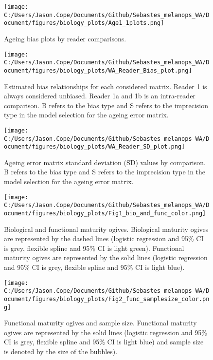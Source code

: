 \documentclass[11pt,
  letterpaper,
]{article}
\begin{document}
\clearpage

\begin{figure}
{\centering
\texttt{[image: C:/Users/Jason.Cope/Documents/Github/Sebastes\_melanops\_WA/Document/figures/biology\_plots/Age1\_1plots.png]}
}
\caption{Ageing bias plots by reader comparisons.\label{fig:a1-bias}}
\end{figure}

\pagebreak

\begin{figure}
{\centering
\texttt{[image: C:/Users/Jason.Cope/Documents/Github/Sebastes\_melanops\_WA/Document/figures/biology\_plots/WA\_Reader\_Bias\_plot.png]}
}
\caption{Estimated bias relationships for each considered matrix. Reader 1 is always considered unbiased. Reader 1a and 1b is an intra-reader comparison. B refers to the bias type and S refers to the imprecision type in the model selection for the ageing error matrix.\label{fig:age-error-bias}}
\end{figure}

\pagebreak

\begin{figure}
{\centering
\texttt{[image: C:/Users/Jason.Cope/Documents/Github/Sebastes\_melanops\_WA/Document/figures/biology\_plots/WA\_Reader\_SD\_plot.png]}
}
\caption{Ageing error matrix standard deviation (SD) values by comparison. B refers to the bias type and S refers to the imprecision type in the model selection for the ageing error matrix.\label{fig:age-error-sd}}
\end{figure}

\pagebreak

\begin{figure}
{\centering
\texttt{[image: C:/Users/Jason.Cope/Documents/Github/Sebastes\_melanops\_WA/Document/figures/biology\_plots/Fig1\_bio\_and\_func\_color.png]}
}
\caption{Biological and functional maturity ogives. Biological maturity ogives are represented by the dashed lines (logistic regression and 95\% CI is grey, flexible spline and 95\% CI is light green). Functional maturity ogives are represented by the solid lines (logistic regression and 95\% CI is grey, flexible spline and 95\% CI is light blue).\label{fig:bio-fxn-mat-color}}
\end{figure}

\pagebreak

\begin{figure}
{\centering
\texttt{[image: C:/Users/Jason.Cope/Documents/Github/Sebastes\_melanops\_WA/Document/figures/biology\_plots/Fig2\_func\_samplesize\_color.png]}
}
\caption{Functional maturity ogives and sample size. Functional maturity ogives are represented by the solid lines (logistic regression and 95\% CI is grey, flexible spline and 95\% CI is light blue) and sample size is denoted by the size of the bubbles).\label{fig:fxn-spline-mat-color}}
\end{figure}
\end{document}
